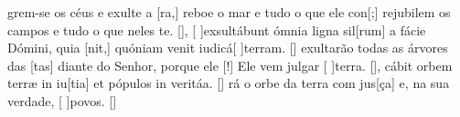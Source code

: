 {    {grem-se os céus e exulte a [ra,] reboe o mar e tudo o que ele con[;] rejubilem os campos e tudo o que neles te. [\LinkPT]},
  {[ ]{ex}sultábunt ómnia ligna sil[rum] a fácie Dómini, quia [nit,] quóniam venit iudicá[ ]{ter}ram. [\LinkLA]}%
    { exultarão todas as árvores das [tas] diante do Senhor, porque ele [!] Ele vem julgar [ ]{ter}ra. [\LinkPT]},
  {cábit orbem terræ in iu[tia] et pópulos in veritáa. [\LinkLA]}%
    {rá o orbe da terra com jus[ça] e, na sua verdade, [ ]{po}vos. [\LinkPT]}
}